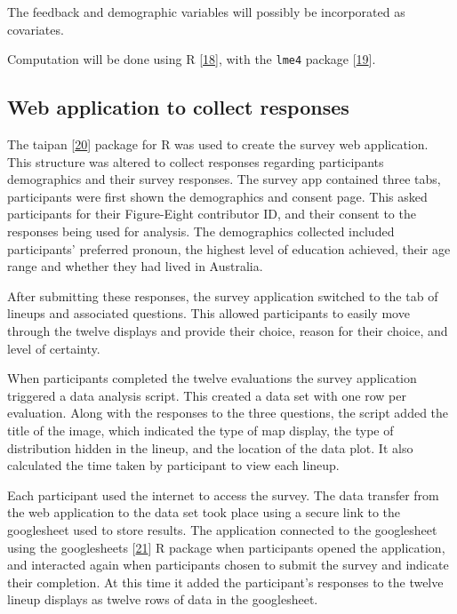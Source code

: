 \documentclass[conference,final,]{IEEEtran}
\begin{document}
The feedback and demographic variables will possibly be incorporated as covariates.

Computation will be done using R {[}\protect\hyperlink{ref-RCore}{18}{]}, with the \texttt{lme4} package {[}\protect\hyperlink{ref-lme4}{19}{]}.

\hypertarget{web-application-to-collect-responses}{%
\subsection{Web application to collect responses}\label{web-application-to-collect-responses}}

The taipan {[}\protect\hyperlink{ref-taipan}{20}{]} package for R was used to create the survey web application.
This structure was altered to collect responses regarding participants demographics and their survey responses.
The survey app contained three tabs, participants were first shown the demographics and consent page.
This asked participants for their Figure-Eight contributor ID, and their consent to the responses being used for analysis. The demographics collected included participants' preferred pronoun, the highest level of education achieved, their age range and whether they had lived in Australia.

After submitting these responses, the survey application switched to the tab of lineups and associated questions. This allowed participants to easily move through the twelve displays and provide their choice, reason for their choice, and level of certainty.

When participants completed the twelve evaluations the survey application triggered a data analysis script. This created a data set with one row per evaluation. Along with the responses to the three questions, the script added the title of the image, which indicated the type of map display, the type of distribution hidden in the lineup, and the location of the data plot. It also calculated the time taken by participant to view each lineup.

Each participant used the internet to access the survey.
The data transfer from the web application to the data set took place using a secure link to the googlesheet used to store results. The application connected to the googlesheet using the googlesheets {[}\protect\hyperlink{ref-sheets}{21}{]} R package when participants opened the application, and interacted again when participants chosen to submit the survey and indicate their completion. At this time it added the participant's responses to the twelve lineup displays as twelve rows of data in the googlesheet.
\end{document}
